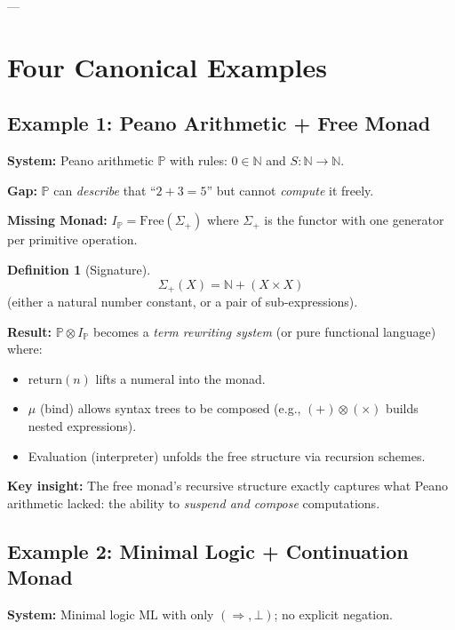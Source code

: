 \documentclass[a4paper,11pt]{article}
\theoremstyle{definition}
\newtheorem{definition}{Definition}[section]
\begin{document}
---

\section{Four Canonical Examples}

\subsection{Example 1: Peano Arithmetic + Free Monad}

\textbf{System:} Peano arithmetic $\mathbb{P}$ with rules: $0 \in \mathbb{N}$ and $S : \mathbb{N} \to \mathbb{N}$.

\textbf{Gap:} $\mathbb{P}$ can \emph{describe} that ``$2+3=5$'' but cannot \emph{compute} it freely.

\textbf{Missing Monad:} $I_{\mathbb{P}} = \text{Free}(\Sigma_+)$ where $\Sigma_+$ is the functor with one generator per primitive operation.

\begin{definition}[Signature]
\[\Sigma_+(X) = \mathbb{N} + (X \times X)\]
(either a natural number constant, or a pair of sub-expressions).
\end{definition}

\textbf{Result:} $\mathbb{P} \otimes I_{\mathbb{P}}$ becomes a \emph{term rewriting system} (or pure functional language) where:
\begin{itemize}
  \item $\text{return}(n)$ lifts a numeral into the monad.
  \item $\mu$ (bind) allows syntax trees to be composed (e.g., $(+) \otimes (\times)$ builds nested expressions).
  \item Evaluation (interpreter) unfolds the free structure via recursion schemes.
\end{itemize}

\textbf{Key insight:} The free monad's recursive structure exactly captures what Peano arithmetic lacked: the ability to \emph{suspend and compose} computations.

\subsection{Example 2: Minimal Logic + Continuation Monad}

\textbf{System:} Minimal logic $\text{ML}$ with only $(\Rightarrow, \bot)$; no explicit negation.
\end{document}
